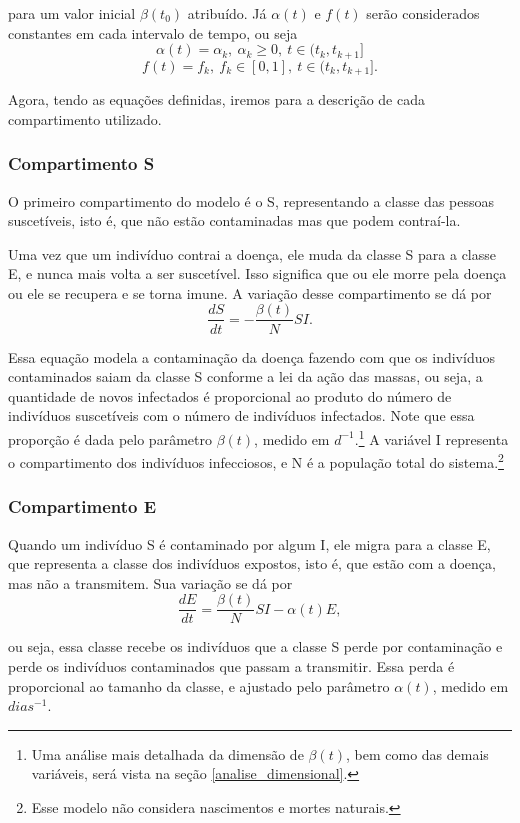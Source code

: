 \documentclass{article}
\begin{document}
\noindent para um valor inicial $\beta(t_0)$ atribuído. Já $\alpha(t)$ e $f(t)$ serão considerados constantes em cada intervalo de tempo, ou seja
\[\alpha(t) = \alpha_k, ~\alpha_k \geq 0, ~t \in (t_k, t_{k + 1}]\]
\[f(t) = f_k, ~f_k \in [0, 1], ~t \in (t_k, t_{k + 1}].\]

Agora, tendo as equações definidas, iremos para a descrição de cada compartimento utilizado.

\subsubsection{Compartimento S}
O primeiro compartimento do modelo é o S, representando a classe das pessoas suscetíveis, isto é, que não estão contaminadas mas que podem contraí-la.

Uma vez que um indivíduo contrai a doença, ele muda da classe S para a classe E, e nunca mais volta a ser suscetível. Isso significa que ou ele morre pela doença ou ele se recupera e se torna imune. A variação desse compartimento se dá por
\[\dfrac{dS}{dt} = -\dfrac{\beta(t)}{N}SI.\]

Essa equação modela a contaminação da doença fazendo com que os indivíduos contaminados saiam da classe S conforme a lei da ação das massas, ou seja, a quantidade de novos infectados é proporcional ao produto do número de indivíduos suscetíveis com o número de indivíduos infectados. Note que essa proporção é dada pelo parâmetro $\beta(t)$, medido em $d^{-1}$.\footnote{Uma análise mais detalhada da dimensão de $\beta(t)$, bem como das demais variáveis, será vista na seção \ref{analise_dimensional}.} A variável I representa o compartimento dos indivíduos infecciosos, e N é a população total do sistema.\footnote{Esse modelo não considera nascimentos e mortes naturais.}

\subsubsection{Compartimento E}
Quando um indivíduo S é contaminado por algum I, ele migra para a classe E, que representa a classe dos indivíduos expostos, isto é, que estão com a doença, mas não a transmitem. Sua variação se dá por
\[\dfrac{dE}{dt} = \dfrac{\beta(t)}{N}SI - \alpha(t) E,\]

\noindent ou seja, essa classe recebe os indivíduos que a classe S perde por contaminação e perde os indivíduos contaminados que passam a transmitir. Essa perda é proporcional ao tamanho da classe, e ajustado pelo parâmetro $\alpha(t)$, medido em $dias^{-1}$.
\end{document}
